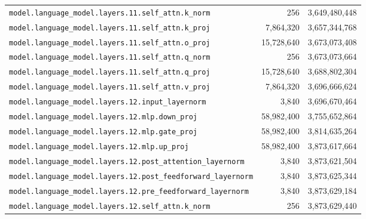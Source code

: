 \documentclass[10pt,a4paper]{article}
\theoremstyle{definition}
\begin{document}
\begin{appendices}
\begin{longtable}{p{9.5cm}rr}
\texttt{model.\allowbreak{}language\_model.\allowbreak{}layers.\allowbreak{}11.\allowbreak{}self\_attn.\allowbreak{}k\_norm} & 256 & 3,649,480,448 \\
\texttt{model.\allowbreak{}language\_model.\allowbreak{}layers.\allowbreak{}11.\allowbreak{}self\_attn.\allowbreak{}k\_proj} & 7,864,320 & 3,657,344,768 \\
\texttt{model.\allowbreak{}language\_model.\allowbreak{}layers.\allowbreak{}11.\allowbreak{}self\_attn.\allowbreak{}o\_proj} & 15,728,640 & 3,673,073,408 \\
\texttt{model.\allowbreak{}language\_model.\allowbreak{}layers.\allowbreak{}11.\allowbreak{}self\_attn.\allowbreak{}q\_norm} & 256 & 3,673,073,664 \\
\texttt{model.\allowbreak{}language\_model.\allowbreak{}layers.\allowbreak{}11.\allowbreak{}self\_attn.\allowbreak{}q\_proj} & 15,728,640 & 3,688,802,304 \\
\texttt{model.\allowbreak{}language\_model.\allowbreak{}layers.\allowbreak{}11.\allowbreak{}self\_attn.\allowbreak{}v\_proj} & 7,864,320 & 3,696,666,624 \\
\texttt{model.\allowbreak{}language\_model.\allowbreak{}layers.\allowbreak{}12.\allowbreak{}input\_layernorm} & 3,840 & 3,696,670,464 \\
\texttt{model.\allowbreak{}language\_model.\allowbreak{}layers.\allowbreak{}12.\allowbreak{}mlp.\allowbreak{}down\_proj} & 58,982,400 & 3,755,652,864 \\
\texttt{model.\allowbreak{}language\_model.\allowbreak{}layers.\allowbreak{}12.\allowbreak{}mlp.\allowbreak{}gate\_proj} & 58,982,400 & 3,814,635,264 \\
\texttt{model.\allowbreak{}language\_model.\allowbreak{}layers.\allowbreak{}12.\allowbreak{}mlp.\allowbreak{}up\_proj} & 58,982,400 & 3,873,617,664 \\
\texttt{model.\allowbreak{}language\_model.\allowbreak{}layers.\allowbreak{}12.\allowbreak{}post\_attention\_layernorm} & 3,840 & 3,873,621,504 \\
\texttt{model.\allowbreak{}language\_model.\allowbreak{}layers.\allowbreak{}12.\allowbreak{}post\_feedforward\_layernorm} & 3,840 & 3,873,625,344 \\
\texttt{model.\allowbreak{}language\_model.\allowbreak{}layers.\allowbreak{}12.\allowbreak{}pre\_feedforward\_layernorm} & 3,840 & 3,873,629,184 \\
\texttt{model.\allowbreak{}language\_model.\allowbreak{}layers.\allowbreak{}12.\allowbreak{}self\_attn.\allowbreak{}k\_norm} & 256 & 3,873,629,440 \\

\end{longtable}
\end{appendices}
\end{document}
